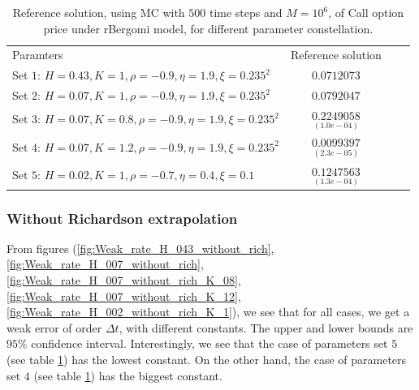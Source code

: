 \documentclass[11pt]{article}
\begin{document}
\begin{table}[!h]
	\centering
	\begin{tabular}{l*{2}{c}r}
		Paramters            & Reference solution    \\
	Set $1$:	$H=0.43, K=1, \rho=-0.9, \eta=1.9,\xi=0.235^2$   & $\underset{}{0.0712073}$  \\	
			Set $2$:	$H=0.07, K=1, \rho=-0.9, \eta=1.9,\xi=0.235^2$   & $\underset{}{0.0792047}$  \\	
			Set $3$: $H=0.07, K=0.8, \rho=-0.9, \eta=1.9,\xi=0.235^2$   & $\underset{(1.0e-04)}{0.2249058}$  \\
		Set $4$: 	$H=0.07, K=1.2, \rho=-0.9, \eta=1.9,\xi=0.235^2$   & $\underset{(2.3e-05)}{0.0099397}$  \\
				Set $5$:	$H=0.02, K=1, \rho=-0.7, \eta=0.4,\xi=0.1$   & $\underset{(1.3e-04)}{0.1247563}$  \\
		\hline
	\end{tabular}
	\caption{Reference solution, using MC with $500$ time steps and $M=10^6$, of Call option price under rBergomi model, for different parameter constellation.}
	\label{table:Reference solution, using MC with $500$ time steps, of Call option price under rBergomi model, for different parameter constellation.}
\end{table}
\FloatBarrier


\subsubsection{Without Richardson extrapolation}
From figures (\ref{fig:Weak_rate_H_043_without_rich},\ref{fig:Weak_rate_H_007_without_rich},\ref{fig:Weak_rate_H_007_without_rich_K_08},\ref{fig:Weak_rate_H_007_without_rich_K_12},\ref{fig:Weak_rate_H_002_without_rich_K_1}), we see that for all cases, we get a weak error of order $\Delta t$, with different  constants. The upper and lower bounds are $95\%$ confidence interval. Interestingly, we see that the case of parameters set $5$ (see table \ref{table:Reference solution, using MC with $500$ time steps, of Call option price under rBergomi model, for different parameter constellation.}) has the lowest constant. On the other hand, the case of parameters set $4$ (see table \ref{table:Reference solution, using MC with $500$ time steps, of Call option price under rBergomi model, for different parameter constellation.}) has the biggest constant.
\end{document}
